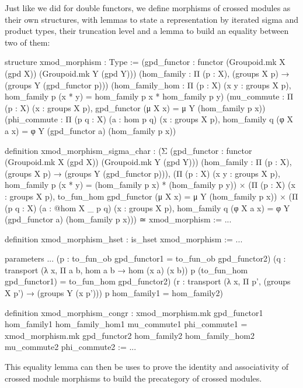 Just like we did for double functors, we define morphisms of crossed modules as
their own structures, with lemmas to state a representation by iterated sigma
and product types, their truncation level and a lemma to build an equality between
two of them:
\begin{leancodebr}
  structure xmod_morphism : Type :=
    (gpd_functor : functor (Groupoid.mk X (gpd X)) (Groupoid.mk Y (gpd Y)))
    (hom_family : Π (p : X), (groups X p) → (groups Y (gpd_functor p)))
    (hom_family_hom : Π (p : X) (x y : groups X p),
      hom_family p (x * y) = hom_family p x * hom_family p y)
    (mu_commute : Π (p : X) (x : groups X p), 
      gpd_functor (μ X x) = μ Y (hom_family p x))
    (phi_commute : Π (p q : X) (a : hom p q) (x : groups X p),
      hom_family q (φ X a x) = φ Y (gpd_functor a) (hom_family p x))

  definition xmod_morphism_sigma_char :
    (Σ (gpd_functor : functor (Groupoid.mk X (gpd X)) (Groupoid.mk Y (gpd Y)))
      (hom_family : Π (p : X), (groups X p) → (groups Y (gpd_functor p))),
      (Π (p : X) (x y : groups X p),
        hom_family p (x * y) = (hom_family p x) * (hom_family p y))
      × (Π (p : X) (x : groups X p),
      to_fun_hom gpd_functor (μ X x) = μ Y (hom_family p x))
      × (Π (p q : X) (a : @hom X _ p q) (x : groups X p),
      hom_family q (φ X a x) = φ Y (gpd_functor a) (hom_family p x)))
        ≃ xmod_morphism := ...

  definition xmod_morphism_hset : is_hset xmod_morphism := ...

  parameters ...
    (p : to_fun_ob gpd_functor1 = to_fun_ob gpd_functor2)
    (q : transport (λ x, Π a b, hom a b → hom (x a) (x b)) p
      (to_fun_hom gpd_functor1) = to_fun_hom gpd_functor2)
    (r : transport (λ x, Π p', (groups X p') → (groups Y (x p'))) p 
      hom_family1 = hom_family2)

  definition xmod_morphism_congr :
    xmod_morphism.mk gpd_functor1 hom_family1 
      hom_family_hom1 mu_commute1 phi_commute1
    = xmod_morphism.mk gpd_functor2 hom_family2
      hom_family_hom2 mu_commute2 phi_commute2 := ...
\end{leancodebr}

This equality lemma can then be uses to prove the identity and associativity of
crossed module morphisms to build the precategory of crossed modules.

